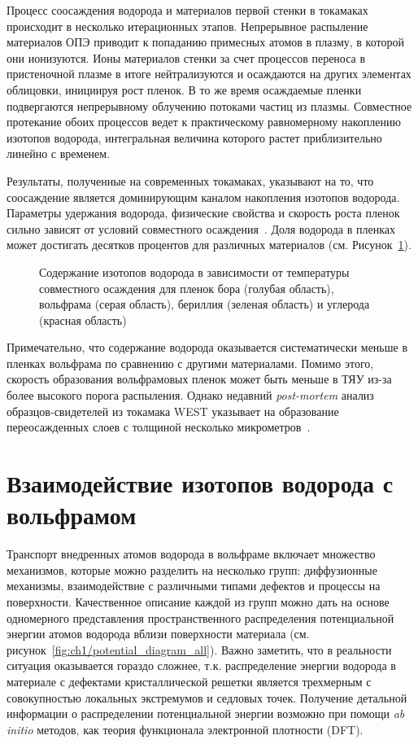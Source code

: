 Процесс соосаждения водорода и материалов первой стенки в токамаках происходит в несколько итерационных этапов. Непрерывное распыление материалов ОПЭ приводит к попаданию примесных атомов в плазму, в которой они ионизуются. Ионы материалов стенки за счет процессов переноса в пристеночной плазме в итоге нейтрализуются и осаждаются на других элементах облицовки, инициируя рост пленок. В то же время осаждаемые пленки подвергаются непрерывному облучению потоками частиц из плазмы. Совместное протекание обоих процессов ведет к практическому равномерному накоплению изотопов водорода, интегральная величина которого растет приблизительно линейно с временем.

Результаты, полученные на современных токамаках, указывают на то, что соосаждение является доминирующим каналом накопления изотопов водорода. Параметры удержания водорода, физические свойства и скорость роста пленок сильно зависят от условий совместного осаждения~\cite{Gasparyan2019,Krat2020,Krat2025}. Доля водорода в пленках может достигать десятков процентов для различных материалов (см. Рисунок~\cref{fig:ch1/codeposition_review}).
\begin{figure}[ht]
    \caption{Содержание изотопов водорода в зависимости от температуры совместного осаждения для пленок бора (голубая область), вольфрама (серая область), бериллия (зеленая область) и углерода (красная область)~\cite{Pitts2025}}\label{fig:ch1/codeposition_review}
\end{figure}
Примечательно, что содержание водорода оказывается систематически меньше в пленках вольфрама по сравнению с другими материалами. Помимо этого, скорость образования вольфрамовых пленок может быть меньше в ТЯУ из-за более высокого порога распыления. Однако недавний \textit{post-mortem} анализ образцов-свидетелей из токамака WEST указывает на образование переосажденных слоев с толщиной несколько микрометров~\cite{Bucalossi2024}.

\section{Взаимодействие изотопов водорода с вольфрамом}\label{subsec:ch1/sec4}

Транспорт внедренных атомов водорода в вольфраме включает множество механизмов, которые можно разделить на несколько групп: диффузионные механизмы, взаимодействие с различными типами дефектов и процессы на поверхности. Качественное описание каждой из групп можно дать на основе одномерного представления пространственного распределения потенциальной энергии атомов водорода вблизи поверхности материала (см. рисунок~\cref{fig:ch1/potential_diagram_all}). Важно заметить, что в реальности ситуация оказывается гораздо сложнее, т.к. распределение энергии водорода в материале с дефектами кристаллической решетки является трехмерным с совокупностью локальных экстремумов и седловых точек. Получение детальной информации о распределении потенциальной энергии возможно при помощи \textit{ab initio} методов, как теория функционала электронной плотности (DFT).

